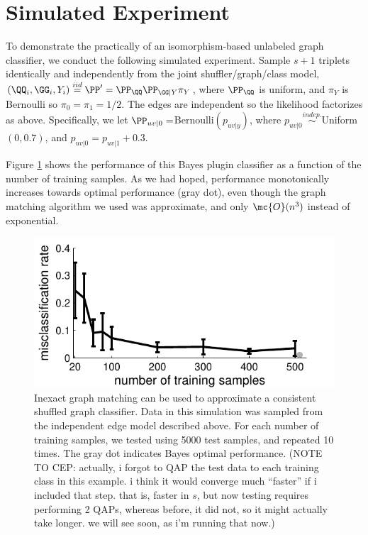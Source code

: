 \documentclass[10pt,journal,cspaper,compsoc]{IEEEtran}
\begin{document}



\section{Simulated Experiment} %
\label{sec:simulated_experiment}

To demonstrate the practically of an isomorphism-based unlabeled graph classifier, we conduct the following simulated experiment. Sample $s+1$ triplets identically and independently from the joint shuffler/graph/class model, $(\QQ_i,\GG_i,Y_i)\overset{iid}{=}\PP'=\PP_{\QQ}\PP_{\GG|Y} \pi_Y$, where $\PP_{\QQ}$ is uniform, and $\pi_Y$ is Bernoulli so $\pi_0=\pi_1=1/2$.  The edges are independent so the likelihood factorizes as above.  Specifically, we let $\PP_{uv|0}=$Bernoulli$(p_{uv|y})$, where $p_{uv|0} \overset{indep.}{\sim}$Uniform$(0,0.7)$, and $p_{uv|0}=p_{uv|1}+0.3$.  


Figure \ref{fig:1} shows the performance of this Bayes plugin classifier as a function of the number of training samples.  As we had hoped, performance monotonically increases towards optimal performance (gray dot), even though the graph matching algorithm we used was approximate, and only $\mc{O}(n^3)$ instead of exponential.

\begin{figure}[htbp]
	\centering
		\includegraphics[width=1.0\linewidth]{../figs/hetero_easy_n10_MC5000_QAP_vs_n.pdf}
	\caption{Inexact graph matching can be used to approximate a consistent shuffled graph classifier.  Data in this simulation was sampled from the independent edge model described above.  For each number of training samples, we tested using 5000 test samples, and repeated 10 times.  The gray dot indicates Bayes optimal performance. (NOTE TO CEP: actually, i forgot to QAP the test data to each training class in this example.  i think it would converge much ``faster'' if i included that step. that is, faster in $s$, but now testing requires performing 2 QAPs, whereas before, it did not, so it might actually take longer.  we will see soon, as i'm running that now.)}
	\label{fig:1}
\end{figure}
\end{document}
